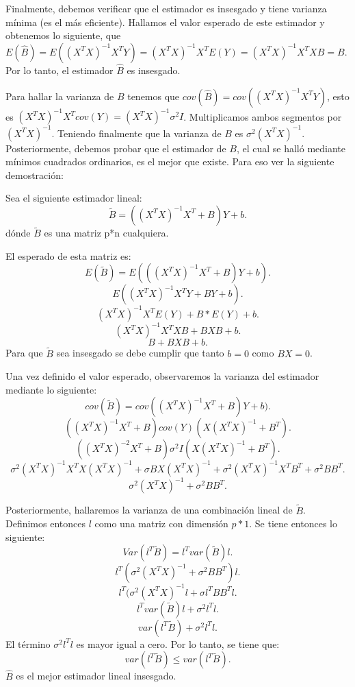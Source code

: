 \documentclass{article}
\begin{document}
Finalmente, debemos verificar que el estimador es insesgado y tiene varianza mínima (es el más eficiente). Hallamos el valor esperado de este estimador y obtenemos lo siguiente, que $E(\hat{B})=E((X^{T}X)^{-1}X^{T}Y)=(X^{T}X)^{-1}X^{T}E(Y)=(X^{T}X)^{-1}X^{T}XB=B$. Por lo tanto, el estimador $\hat{B}$ es insesgado.

Para hallar la varianza de $B$ tenemos que $cov(\hat{B})=cov((X^{T}X)^{-1}X^{T}Y)$, esto es $(X^{T}X)^{-1}X^{T}cov(Y)=(X^{T}X)^{-1}\sigma^{2}I$. Multiplicamos ambos segmentos por $(X^{T}X)^{-1}$. Teniendo finalmente que la varianza de $B$ es $\sigma^{2}(X^{T}X)^{-1}$. 
Posteriormente, debemos probar que el estimador de $B$, el cual se halló mediante mínimos cuadrados ordinarios, es el mejor que existe. Para eso ver la siguiente demostración: 

Sea el siguiente estimador lineal:
\[ 
	\tilde{B}=((X^{T}X)^{-1}X^{T}+B)Y + b
.\]
dónde $\tilde{B}$ es una matriz p*n cualquiera.

El esperado de esta matriz es:
\[ 
	E(\tilde{B})=E(((X^{T}X)^{-1}X^{T}+B)Y+b) 
.\]
\[ 
E((X^{T}X)^{-1}X^{T}Y+BY+b)
.\]
\[ 
	(X^{T}X)^{-1}X^{T}E(Y)+B*E(Y)+b
.\]
\[ 
	(X^{T}X)^{-1}X^{T}XB+BXB+b
.\]
\[ 
B+BXB+b
.\]
Para que $\tilde{B}$ sea insesgado se debe cumplir que tanto $b=0$ como $BX=0$.

Una vez definido el valor esperado, observaremos la varianza del estimador mediante lo siguiente:
\[ 
	cov(\tilde{B})=cov((X^{T}X)^{-1}X^{T}+B)Y+b)
.\]
\[ 
	((X^{T}X)^{-1}X^{T}+B)cov(Y)(X(X^{T}X)^{-1}+B^{T})
.\]
\[ 
	((X^{T}X)^{-2}X^{T}+B)\sigma^{2} I(X(X^{T}X)^{-1}+B^{T})
.\]
\[ 
	\sigma^{2}(X^{T}X)^{-1}X^{T}X(X^{T}X)^{-1}+\sigma BX(X^{T}X)^{-1}+\sigma^{2}(X^{T}X)^{-1}X^{T}B^{T}+\sigma^{2} BB^{T}
.\]
\[ 
	\sigma^{2}(X^{T}X)^{-1}+\sigma^{2}BB^{T}
.\]

Posteriormente, hallaremos la varianza de una combinación lineal de $\tilde{B}$. Definimos entonces $l$ como una matriz con dimensión $p*1$. Se tiene entonces lo siguiente:
\[ 
	Var(l^{T}\tilde{B})=l^{T}var(\tilde{B})l
.\]
\[ 
	l^{T}(\sigma^{2}(X^{T}X)^{-1}+\sigma^{2}BB^{T})l
.\]
\[ 
	l^{T}(\sigma^{2}(X^{T}X)^{-1}l+\sigma l^{T}BB^{T}l
.\]
\[ 
	l^{T}var(\tilde{B})l+\sigma^{2}l^{T}l
.\]
\[ 
	var(l^{T}\tilde{B})+\sigma^{2}l^{T}l
.\]
El término $\sigma^{2}l^{T}l$ es mayor igual a cero. Por lo tanto, se tiene que:
\[ 
	var(l^{T}\tilde{B})\leq var(l^{T}\tilde{B})
.\]
$\hat{B}$ es el mejor estimador lineal insesgado.
\end{document}
